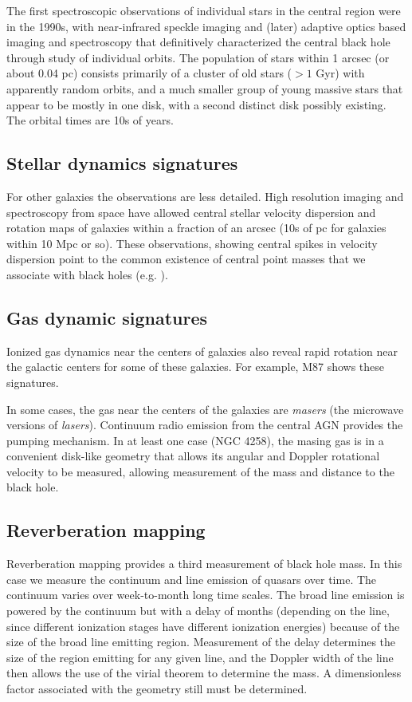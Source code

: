 The first spectroscopic observations of individual stars in the
central region were in the 1990s, with near-infrared speckle imaging
and (later) adaptive optics based imaging and spectroscopy that
definitively characterized the central black hole through study of
individual orbits.  The population of stars within 1 arcsec (or about
0.04 pc) consists primarily of a cluster of old stars ($>1$ Gyr) with
apparently random orbits, and a much smaller group of young massive
stars that appear to be mostly in one disk, with a second distinct
disk possibly existing. The orbital times are 10s of years.

\subsection{Stellar dynamics signatures}

For other galaxies the observations are less detailed. High resolution
imaging and spectroscopy from space have allowed central stellar
velocity dispersion and rotation maps of galaxies within a fraction of
an arcsec (10s of pc for galaxies within 10 Mpc or so). These
observations, showing central spikes in velocity dispersion point to
the common existence of central point masses that we associate with
black holes (e.g. \citealt{kormendy96b}).

\subsection{Gas dynamic signatures}

Ionized gas dynamics near the centers of galaxies also reveal rapid
rotation near the galactic centers for some of these galaxies. For
example, M87 shows these signatures.

In some cases, the gas near the centers of the galaxies are {\it
masers} (the microwave versions of {\it lasers}). Continuum radio
emission from the central AGN provides the pumping mechanism. In at
least one case (NGC 4258), the masing gas is in a convenient disk-like
geometry that allows its angular and Doppler rotational velocity to be
measured, allowing measurement of the mass and distance to the black
hole.

\subsection{Reverberation mapping}

Reverberation mapping provides a third measurement of black hole
mass. In this case we measure the continuum and line emission of
quasars over time. The continuum varies over week-to-month long time
scales. The broad line emission is powered by the continuum but with a
delay of months (depending on the line, since different ionization
stages have different ionization energies) because of the size of the
broad line emitting region. Measurement of the delay determines the
size of the region emitting for any given line, and the Doppler width
of the line then allows the use of the virial theorem to determine the
mass. A dimensionless factor associated with the geometry still must
be determined. 


